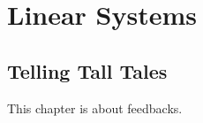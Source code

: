 \chapter{Linear Systems}\label{c:linsys}
\section{Telling Tall Tales}

This chapter is about \gls{feedback}s.

